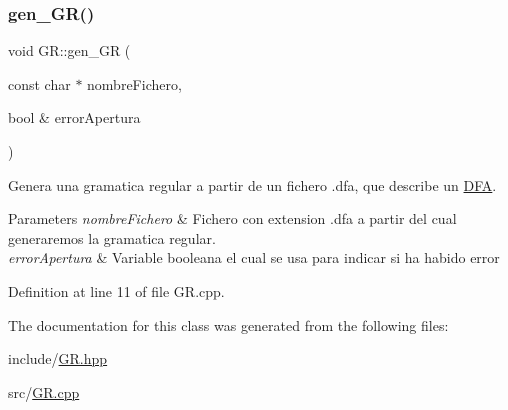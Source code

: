\subsubsection{\texorpdfstring{gen\+\_\+\+G\+R()}{gen\_GR()}}
{\footnotesize\ttfamily void G\+R\+::gen\+\_\+\+GR (\begin{DoxyParamCaption}\item[{const char $\ast$}]{nombre\+Fichero,  }\item[{bool \&}]{error\+Apertura }\end{DoxyParamCaption})}



Genera una gramatica regular a partir de un fichero .dfa, que describe un \hyperlink{class_d_f_a}{D\+FA}. 


\begin{DoxyParams}{Parameters}
{\em nombre\+Fichero} & Fichero con extension .dfa a partir del cual generaremos la gramatica regular. \\
\hline
{\em error\+Apertura} & Variable booleana el cual se usa para indicar si ha habido error \\
\hline
\end{DoxyParams}


Definition at line 11 of file G\+R.\+cpp.



The documentation for this class was generated from the following files\+:\begin{DoxyCompactItemize}
\item 
include/\hyperlink{_g_r_8hpp}{G\+R.\+hpp}\item 
src/\hyperlink{_g_r_8cpp}{G\+R.\+cpp}\end{DoxyCompactItemize}
